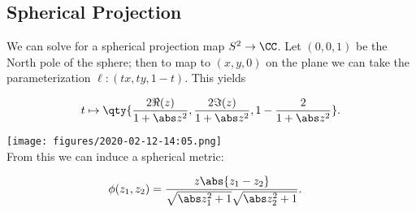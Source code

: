 \hypertarget{spherical-projection}{%
\subsection{Spherical Projection}\label{spherical-projection}}

We can solve for a spherical projection map \(S^2 \to \CC\). Let
\((0,0,1)\) be the North pole of the sphere; then to map to
\((x, y, 0)\) on the plane we can take the parameterization
\(\ell: (tx, ty, 1-t)\). This yields

\begin{align*}
t \mapsto \qty{ \frac{2\Re(z)}{1 + \abs z^2} , \frac{2\Im(z)}{1 + \abs z^2}, 1 - \frac{2}{1 + \abs z^2}}
.\end{align*}

\texttt{[image: figures/2020-02-12-14:05.png]}\\

From this we can induce a spherical metric:

\begin{align*}
\phi(z_1, z_2) &= \frac{z \abs{z_1 - z_2}} { \sqrt{\abs z_1^2 + 1} \sqrt{\abs z_2^2 + 1}  }
.\end{align*}

